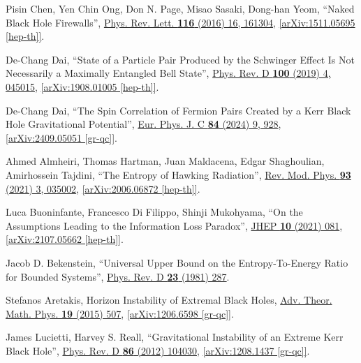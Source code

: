 \documentclass[12pt,preprintnumbers, floatfix, preprintnumbers, letterpaper, superscriptaddress,nofootinbib]{revtex4-2}
\begin{document}
\begin{thebibliography}{99}
Pisin Chen, Yen Chin Ong, Don N. Page, Misao Sasaki, Dong-han Yeom, ``Naked Black Hole Firewalls'', {\href{https://journals.aps.org/prl/abstract/10.1103/PhysRevLett.116.161304}{Phys. Rev. Lett. \textbf{116} (2016) 16, 161304}}, \href{https://arxiv.org/abs/1511.05695}{[arXiv:1511.05695 [hep-th]]}.

De-Chang Dai, ``State of a Particle Pair Produced by the Schwinger Effect Is Not Necessarily a Maximally Entangled Bell State'', {\href{https://journals.aps.org/prd/abstract/10.1103/PhysRevD.100.045015}{Phys. Rev. D \textbf{100} (2019) 4, 045015}}, \href{https://arxiv.org/abs/1908.01005}{[arXiv:1908.01005 [hep-th]]}.

De-Chang Dai, ``The Spin Correlation of Fermion Pairs Created by a Kerr Black Hole Gravitational Potential'', {\href{https://link.springer.com/article/10.1140/epjc/s10052-024-13288-2}{Eur. Phys. J. C \textbf{84} (2024) 9, 928}}, \href{https://arxiv.org/abs/2409.05051}{[arXiv:2409.05051 [gr-qc]]}.


Ahmed Almheiri, Thomas Hartman, Juan Maldacena, Edgar Shaghoulian, Amirhossein Tajdini, ``The Entropy of Hawking Radiation'', {\href{https://journals.aps.org/rmp/abstract/10.1103/RevModPhys.93.035002}{Rev. Mod. Phys. \textbf{93} (2021) 3, 035002}}, \href{https://arxiv.org/abs/2006.06872}{[arXiv:2006.06872 [hep-th]]}.

Luca Buoninfante, Francesco Di Filippo, Shinji Mukohyama, ``On the Assumptions Leading to the Information Loss Paradox'', {\href{https://doi.org/10.1007/JHEP10(2021)081}{JHEP \textbf{10} (2021) 081}}, \href{https://arxiv.org/abs/2107.05662}{[arXiv:2107.05662 [hep-th]]}.

Jacob D. Bekenstein, ``Universal Upper Bound on the Entropy-To-Energy Ratio for Bounded Systems'', {\href{https://journals.aps.org/prd/abstract/10.1103/PhysRevD.23.287}{Phys. Rev. D \textbf{23} (1981) 287}}.

Stefanos Aretakis, Horizon Instability of Extremal Black Holes, {\href{https://www.intlpress.com/site/pub/pages/journals/items/atmp/content/vols/0019/0003/a001/}{Adv. Theor. Math. Phys. \textbf{19} (2015) 507}}, \href{https://arxiv.org/abs/1206.6598}{[arXiv:1206.6598 [gr-qc]]}.

James Lucietti, Harvey S. Reall, ``Gravitational Instability of an Extreme Kerr Black Hole'', {\href{https://journals.aps.org/prd/abstract/10.1103/PhysRevD.86.104030}{Phys. Rev. D \textbf{86} (2012) 104030}}, \href{https://arxiv.org/abs/1208.1437}{[arXiv:1208.1437 [gr-qc]]}.


\end{thebibliography}
\end{document}
